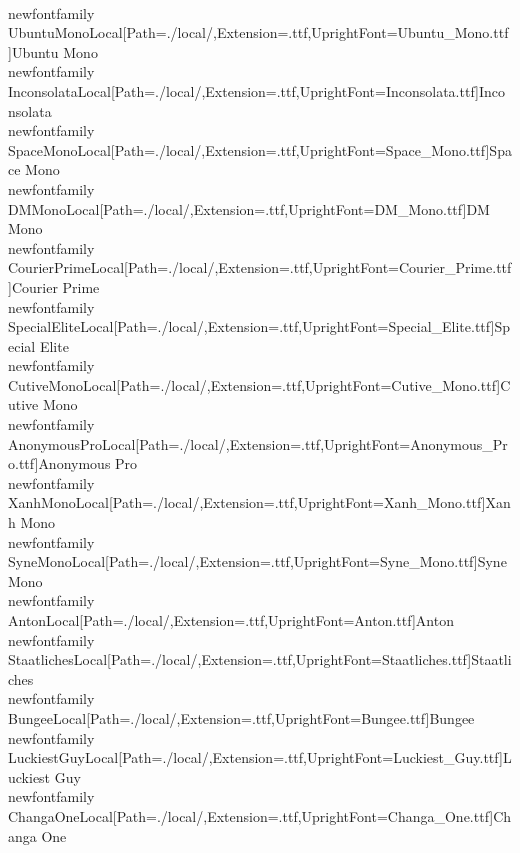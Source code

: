 \\newfontfamily\\UbuntuMonoLocal[Path=./local/,Extension=.ttf,UprightFont={Ubuntu_Mono.ttf}]{Ubuntu Mono}
\\newfontfamily\\InconsolataLocal[Path=./local/,Extension=.ttf,UprightFont={Inconsolata.ttf}]{Inconsolata}
\\newfontfamily\\SpaceMonoLocal[Path=./local/,Extension=.ttf,UprightFont={Space_Mono.ttf}]{Space Mono}
\\newfontfamily\\DMMonoLocal[Path=./local/,Extension=.ttf,UprightFont={DM_Mono.ttf}]{DM Mono}
\\newfontfamily\\CourierPrimeLocal[Path=./local/,Extension=.ttf,UprightFont={Courier_Prime.ttf}]{Courier Prime}
\\newfontfamily\\SpecialEliteLocal[Path=./local/,Extension=.ttf,UprightFont={Special_Elite.ttf}]{Special Elite}
\\newfontfamily\\CutiveMonoLocal[Path=./local/,Extension=.ttf,UprightFont={Cutive_Mono.ttf}]{Cutive Mono}
\\newfontfamily\\AnonymousProLocal[Path=./local/,Extension=.ttf,UprightFont={Anonymous_Pro.ttf}]{Anonymous Pro}
\\newfontfamily\\XanhMonoLocal[Path=./local/,Extension=.ttf,UprightFont={Xanh_Mono.ttf}]{Xanh Mono}
\\newfontfamily\\SyneMonoLocal[Path=./local/,Extension=.ttf,UprightFont={Syne_Mono.ttf}]{Syne Mono}
\\newfontfamily\\AntonLocal[Path=./local/,Extension=.ttf,UprightFont={Anton.ttf}]{Anton}
\\newfontfamily\\StaatlichesLocal[Path=./local/,Extension=.ttf,UprightFont={Staatliches.ttf}]{Staatliches}
\\newfontfamily\\BungeeLocal[Path=./local/,Extension=.ttf,UprightFont={Bungee.ttf}]{Bungee}
\\newfontfamily\\LuckiestGuyLocal[Path=./local/,Extension=.ttf,UprightFont={Luckiest_Guy.ttf}]{Luckiest Guy}
\\newfontfamily\\ChangaOneLocal[Path=./local/,Extension=.ttf,UprightFont={Changa_One.ttf}]{Changa One}

